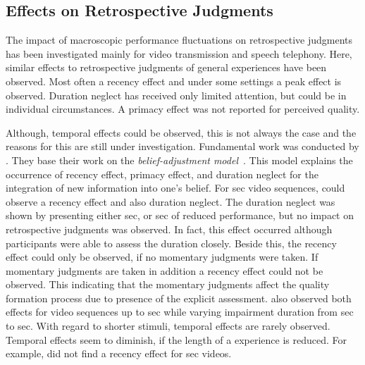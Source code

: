 \subsection{Effects on Retrospective Judgments}
The impact of macroscopic performance fluctuations on retrospective judgments has been investigated mainly for video transmission and speech telephony.
Here, similar effects to retrospective judgments of general experiences have been observed.
Most often a recency effect and under some settings a peak effect is observed.
Duration neglect has received only limited attention, but could be in individual circumstances.
A primacy effect was not reported for perceived quality.

Although, temporal effects could be observed, this is not always the case and the reasons for this are still under investigation.
Fundamental work was conducted by \citet{hands_recency_2001}.
They base their work on the \emph{belief-adjustment model}~\citep{hogarth_order_1992}.
This model explains the occurrence of recency effect, primacy effect, and duration neglect for the integration of new information into one's belief. %
For \unit[30]{sec} video sequences, \citet{hands_recency_2001} could observe a recency effect and also duration neglect.
The duration neglect was shown by presenting either \unit[5]{sec}, or \unit[10]{sec} of reduced performance, but no impact on retrospective judgments was observed.
In fact, this effect occurred although participants were able to assess the duration closely. %
Beside this, the recency effect could only be observed, if no momentary judgments were taken.
If momentary judgments are taken in addition a recency effect could not be observed.
This indicating that the momentary judgments affect the quality formation process due to presence of the explicit assessment.
\citet{hamberg_time-varying_1999} also observed both effects for video sequences up to \unit[180]{sec} while varying impairment duration from \unit[2]{sec} to \unit[10]{sec}.
With regard to shorter stimuli, temporal effects are rarely observed.
Temporal effects seem to diminish, if the length of a experience is reduced.
For example, \citet{ninassi_considering_2009} did not find a recency effect for \unit[8]{sec} videos.

